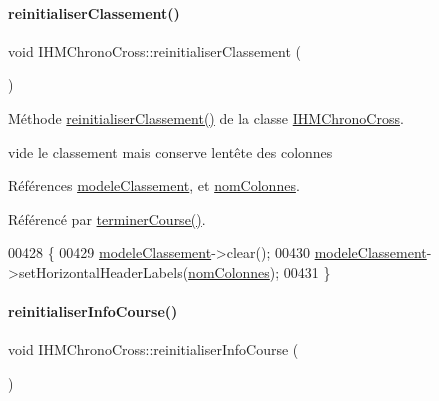 \paragraph{\texorpdfstring{reinitialiser\+Classement()}{reinitialiserClassement()}}
{\footnotesize\ttfamily void I\+H\+M\+Chrono\+Cross\+::reinitialiser\+Classement (\begin{DoxyParamCaption}{ }\end{DoxyParamCaption})\hspace{0.3cm}{\ttfamily [private]}}



Méthode \hyperlink{class_i_h_m_chrono_cross_aaf8fa3bf16956fd0e0ceeab6e65f6741}{reinitialiser\+Classement()} de la classe \hyperlink{class_i_h_m_chrono_cross}{I\+H\+M\+Chrono\+Cross}. 

vide le classement mais conserve l\textquotesingle{}entête des colonnes 

Références \hyperlink{class_i_h_m_chrono_cross_ac25c95280801f36c43a1c41cf2fa253e}{modele\+Classement}, et \hyperlink{class_i_h_m_chrono_cross_a21f1b0ba82ff1b4a7b842b5f3c411e60}{nom\+Colonnes}.



Référencé par \hyperlink{class_i_h_m_chrono_cross_ac89c6ec3040e8b787f1fbdb670405023}{terminer\+Course()}.


\begin{DoxyCode}
00428 \{
00429         \hyperlink{class_i_h_m_chrono_cross_ac25c95280801f36c43a1c41cf2fa253e}{modeleClassement}->clear();
00430         \hyperlink{class_i_h_m_chrono_cross_ac25c95280801f36c43a1c41cf2fa253e}{modeleClassement}->setHorizontalHeaderLabels(\hyperlink{class_i_h_m_chrono_cross_a21f1b0ba82ff1b4a7b842b5f3c411e60}{nomColonnes});
00431 \}
\end{DoxyCode}
\mbox{\label{class_i_h_m_chrono_cross_a1149f4f57c8cf34048f93fba6b4176b3}} 
\paragraph{\texorpdfstring{reinitialiser\+Info\+Course()}{reinitialiserInfoCourse()}}
{\footnotesize\ttfamily void I\+H\+M\+Chrono\+Cross\+::reinitialiser\+Info\+Course (\begin{DoxyParamCaption}{ }\end{DoxyParamCaption})\hspace{0.3cm}{\ttfamily [private]}}



